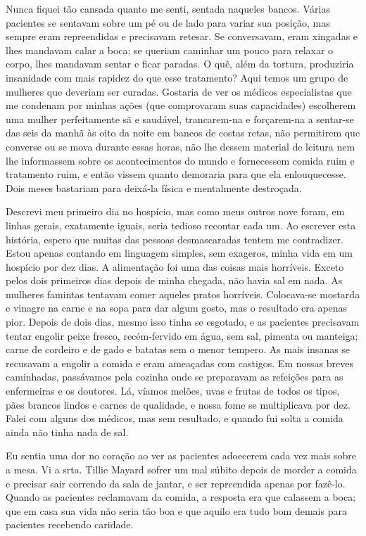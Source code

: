 Nunca fiquei tão cansada quanto me senti, sentada naqueles bancos. Várias
pacientes se sentavam sobre um pé ou de lado para variar sua posição,
mas sempre eram repreendidas e precisavam retesar. Se conversavam, eram
xingadas e lhes mandavam calar a boca; se queriam caminhar um pouco para
relaxar o corpo, lhes mandavam sentar e ficar paradas. O quê, além da
tortura, produziria insanidade com mais rapidez do que esse tratamento?
Aqui temos um grupo de mulheres que deveriam ser curadas. Gostaria de
ver os médicos especialistas que me condenam por minhas ações (que
comprovaram suas capacidades) escolherem uma mulher perfeitamente sã e
saudável, trancarem-na e forçarem-na a sentar-se das seis da manhã às
oito da noite em bancos de costas retas, não permitirem que converse
ou se mova durante essas horas, não lhe dessem material de leitura
nem lhe informassem sobre os acontecimentos do mundo e fornecessem
comida ruim e tratamento ruim, e então vissem quanto demoraria para que
ela enlouquecesse. Dois meses bastariam para deixá-la física e
mentalmente destroçada.

Descrevi meu primeiro dia no hospício, mas como meus outros nove foram,
em linhas gerais, exatamente iguais, seria tedioso recontar cada um. Ao
escrever esta história, espero que muitas das pessoas desmascaradas
tentem me contradizer. Estou apenas contando em linguagem simples, sem
exageros, minha vida em um hospício por dez dias. A alimentação foi uma
das coisas mais horríveis. Exceto pelos dois primeiros dias depois de
minha chegada, não havia sal em nada. As mulheres famintas tentavam
comer aqueles pratos horríveis. Colocava-se mostarda e vinagre na carne
e na sopa para dar algum gosto, mas o resultado era apenas pior. Depois
de dois dias, mesmo isso tinha se esgotado, e as pacientes precisavam
tentar engolir peixe fresco, recém-fervido em água, sem sal, pimenta ou
manteiga; carne de cordeiro e de gado e batatas sem o menor tempero. As
mais insanas se recusavam a engolir a comida e eram ameaçadas com
castigos. Em nossas breves caminhadas, passávamos pela cozinha onde se
preparavam as refeições para as enfermeiras e os doutores. Lá, víamos
melões, uvas e frutas de todos os tipos, pães brancos lindos e carnes
de qualidade, e nossa fome se multiplicava por dez. Falei com alguns dos
médicos, mas sem resultado, e quando fui solta a comida ainda não tinha
nada de sal.

Eu sentia uma dor no coração ao ver as pacientes adoecerem cada vez mais
sobre a mesa. Vi a srta. Tillie Mayard sofrer um mal súbito depois de
morder a comida e precisar sair correndo da sala de jantar, e
ser repreendida apenas por fazê-lo. Quando as pacientes reclamavam da comida, a
resposta era que calassem a boca; que em casa sua vida não seria tão boa
e que aquilo era tudo bom demais para pacientes recebendo caridade.

